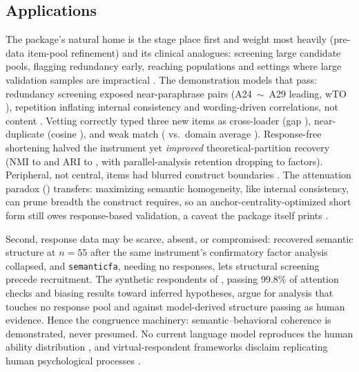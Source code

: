 \subsection{Applications}

The package's natural home is the stage \citet{clark-watson-2019} place
first and weight most heavily (pre-data item-pool refinement) and its
clinical analogues: screening large candidate pools, flagging redundancy
early, reaching populations and settings where large validation samples
are impractical \citep{kambeitz-etal-2025}. The demonstration models
that pass: redundancy screening exposed \valUvaPairsWord{}
near-paraphrase pairs (A24~$\sim$~A29 leading, wTO \valWtoTop), repetition
inflating internal consistency and wording-driven correlations, not
content \citep{christensen-etal-2023,kojima-etal-2026}. Vetting correctly
typed three new items as cross-loader (gap \valIfGap), near-duplicate (cosine
\valIfNearest), and weak match (\valIfWeakSim{} vs.\ domain average \valIfWeakAvg). Response-free
shortening halved the instrument yet \emph{improved} theoretical-partition
recovery (NMI \valSfNmiFull{} to \valSfNmiRed{} and ARI \valSfAriFull{} to \valSfAriRed, with parallel-analysis
retention dropping to \valSfKRedWord{} factors). Peripheral, not central,
items had blurred construct boundaries
\citep{huang-etal-2025, kojima-etal-2026}. The attenuation paradox
(\citealp{clark-watson-2019}) transfers: maximizing semantic homogeneity,
like internal consistency, can prune breadth the construct requires, so
an anchor-centrality-optimized short form still owes response-based
validation, a caveat the package itself prints
\citep{jung-seo-2025,wang-etal-2026}.

Second, response data may be scarce, absent, or compromised:
\citet{muller-2026} recovered semantic structure at $n = 55$ after the
same instrument's confirmatory factor analysis collapsed, and
\texttt{semanticfa}, needing no responses, lets structural screening
precede recruitment. The synthetic respondents of
\citet{westwood-2025}, passing 99.8\% of attention checks and biasing
results toward inferred hypotheses, argue for analysis that touches no
response pool and against model-derived structure passing as human
evidence. Hence the congruence machinery: semantic--behavioral coherence
is demonstrated, never presumed. No current language model reproduces
the human ability distribution \citep{liu-etal-2025}, and
virtual-respondent frameworks disclaim replicating human psychological
processes \citep{lim-etal-2025}.

